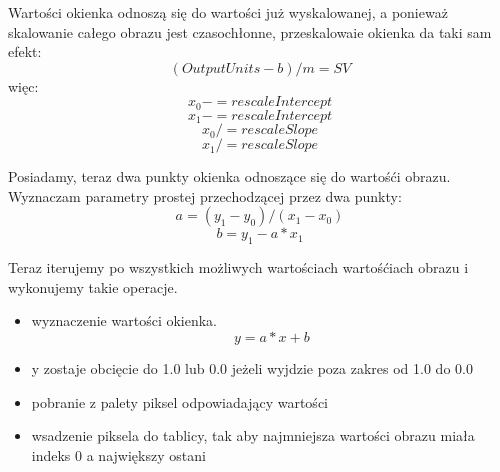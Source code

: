 Wartości okienka odnoszą się do wartości już wyskalowanej, a ponieważ skalowanie całego obrazu jest czasochłonne, przeskalowaie okienka da taki sam efekt:
\[(OutputUnits - b ) / m = SV \]
więc:
\[x_0 -= rescaleIntercept\]
\[x_1 -= rescaleIntercept\]
\[x_0 /= rescaleSlope\]
\[x_1 /= rescaleSlope\]

Posiadamy, teraz dwa punkty okienka odnoszące się do wartośći obrazu.
Wyznaczam parametry prostej przechodzącej przez dwa punkty:
\[a = (y_1 - y_0) / (x_1 - x_0)\]
\[b = y_1 - a * x_1\]

Teraz iterujemy po wszystkich możliwych wartościach wartośćiach obrazu i wykonujemy takie operacje.
\begin{itemize}
    \item wyznaczenie wartości okienka.
    \[y = a * x + b\]
    \item y zostaje obcięcie do 1.0 lub 0.0 jeżeli wyjdzie poza zakres od 1.0 do 0.0
    \item pobranie z palety piksel odpowiadający wartości
    \item wsadzenie piksela do tablicy, tak aby najmniejsza wartości obrazu miała indeks 0 a największy ostani
\end{itemize}